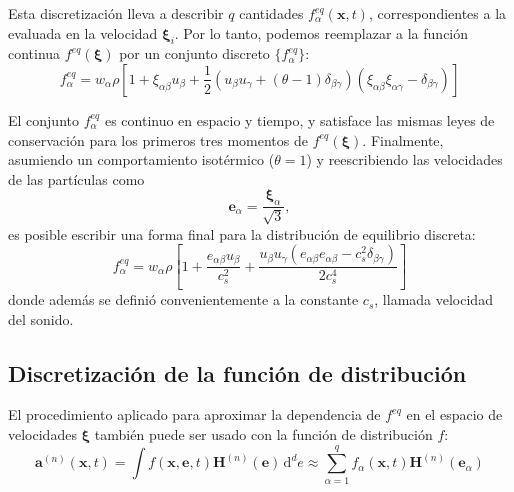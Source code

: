 Esta discretizaci\'on lleva a describir $q$ cantidades $f_{\alpha}^{eq}(\bm{x},t)$, correspondientes a la \edf{} evaluada en la velocidad $\bm{\xi}_i$. Por lo tanto, podemos reemplazar a la funci\'on continua $f^{eq}(\bm{\xi})$ por un conjunto discreto $\{ f_{\alpha}^{eq} \}$:
\begin{equation}
	f_{\alpha}^{eq} = w_{\alpha} \rho \left[ 1 + \xi_{{\alpha}\beta}u_{\beta} + \dfrac{1}{2}\left( u_{\beta}u_{\gamma}+(\theta-1)\delta_{\beta\gamma} \right)\left(\xi_{{\alpha}\beta}\xi_{{\alpha}\gamma} - \delta_{\beta\gamma}\right) \right]
\end{equation}
\par
El conjunto ${f_{\alpha}^{eq}}$ es continuo en espacio y tiempo, y satisface las mismas leyes de conservaci\'on para los primeros tres momentos de $f^{eq}(\bm{\xi})$. Finalmente, asumiendo un comportamiento isot\'ermico ($\theta = 1$) y reescribiendo las velocidades de las part\'iculas como
\begin{equation}
	\bm{e}_{\alpha} = \dfrac{\bm{\xi}_{\alpha}}{\sqrt{3}},
\end{equation}
es posible escribir una forma final para la distribuci\'on de equilibrio discreta:
\begin{equation}
	f_{\alpha}^{eq} = w_{\alpha} \rho \left[ 1 + \dfrac{e_{\alpha \beta}u_{\beta}}{c_s^2} + \dfrac{u_{\beta}u_{\gamma}(e_{\alpha \beta}e_{{\alpha}\beta}-c_s^2\delta_{\beta\gamma})}{2c_s^4} \right]
	\label{eq:feq}
\end{equation}
donde adem\'as se defini\'o convenientemente a la constante $c_s$, llamada velocidad del sonido.


\subsection{Discretizaci\'on de la funci\'on de distribuci\'on}
El procedimiento aplicado para aproximar la dependencia de $f^{eq}$ en el espacio de velocidades $\bm{\xi}$ tambi\'en puede ser usado con la funci\'on de distribuci\'on $f$:
\begin{equation}
	\bm{a}^{(n)}(\bm{x},t) = \int f(\bm{x}, \bm{e}, t) \bm{H}^{(n)}(\bm{e}) \, \mbox{d}^d e \approx \sum_{{\alpha}=1}^q f_{\alpha}(\bm{x},t)\bm{H}^{(n)}(\bm{e}_{\alpha})
\end{equation}

